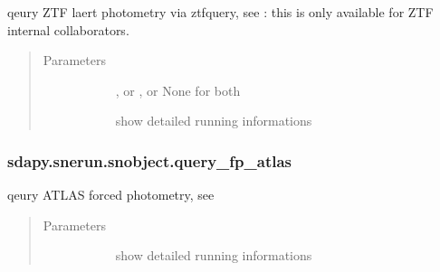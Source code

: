 \documentclass[letterpaper,10pt,english]{sphinxmanual}
\begin{document}
\begin{fulllineitems}
\begin{fulllineitems}
\label{\detokenize{generated/sdapy.snerun.snobject.query_alert_ztf:sdapy.snerun.snobject.query_alert_ztf}}
qeury ZTF laert photometry via ztfquery,
see 
: this is only available for ZTF internal collaborators.
\begin{quote}\begin{description}
\item[{Parameters}] \leavevmode\begin{description}
\item[{}] \leavevmode{[}\sphinxtitleref{str}{]}
, or , or None for both

\item[{}] \leavevmode{[}\sphinxtitleref{bool}{]}
show detailed running informations

\end{description}

\end{description}\end{quote}

\end{fulllineitems}



\subsubsection{sdapy.snerun.snobject.query\_fp\_atlas}
\label{\detokenize{generated/sdapy.snerun.snobject.query_fp_atlas:sdapy-snerun-snobject-query-fp-atlas}}\label{\detokenize{generated/sdapy.snerun.snobject.query_fp_atlas::doc}}

\begin{fulllineitems}
\label{\detokenize{generated/sdapy.snerun.snobject.query_fp_atlas:sdapy.snerun.snobject.query_fp_atlas}}
qeury ATLAS forced photometry, 
see 
\begin{quote}\begin{description}
\item[{Parameters}] \leavevmode\begin{description}
\item[{}] \leavevmode{[}\sphinxtitleref{bool}{]}
show detailed running informations


\end{description}
\end{description}
\end{quote}
\end{fulllineitems}
\end{fulllineitems}
\end{document}
